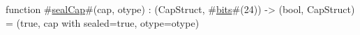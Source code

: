 function #\hyperref[zsealCap]{sealCap}#(cap, otype) : (CapStruct, #\hyperref[zbits]{bits}#(24)) -> (bool, CapStruct) =
    (true, {cap with sealed=true, otype=otype})
